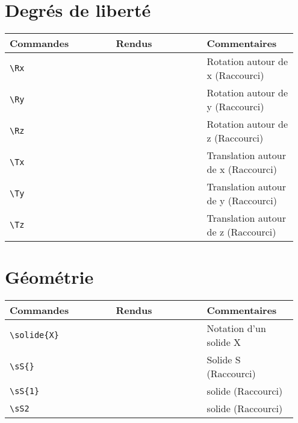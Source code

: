 \documentclass[a4paper,10pt]{article}
\newcommand{\rac}{({\color{red}Raccourci})}
\begin{document}
	\section{Degrés de liberté}
	\noindent
	\begin{tabular}{|p{0.35\linewidth}|p{0.3\linewidth}|p{0.3\linewidth}|}
		\hline
			\textbf{Commandes}&\textbf{Rendus}&\textbf{Commentaires}
		\\\hline\hline
			\verb!\Rx!			&	\Rx			&	Rotation autour de x \rac
		\\\hline
			\verb!\Ry!			&	\Ry			&	Rotation autour de y \rac
		\\\hline
			\verb!\Rz!			&	\Rz			&	Rotation autour de z \rac
		\\\hline
			\verb!\Tx!			&	\Tx			&	Translation autour de x \rac
		\\\hline
			\verb!\Ty!			&	\Ty			&	Translation autour de y \rac
		\\\hline
			\verb!\Tz!			&	\Tz			&	Translation autour de z \rac
		\\\hline
	\end{tabular}
	\section{Géométrie}
	\noindent
	\begin{tabular}{|p{0.35\linewidth}|p{0.3\linewidth}|p{0.3\linewidth}|}
		\hline
			\textbf{Commandes}&\textbf{Rendus}&\textbf{Commentaires}
		\\\hline\hline
			\verb!\solide{X}!		&	\solide{X}		&	Notation d'un solide X
		\\\hline
			\verb!\sS{}!			&	\sS{}			&	Solide S \rac
		\\\hline
			\verb!\sS{1}!			&	\sS{1}			&	solide \rac
		\\\hline
			\verb!\sS2!			&	\sS2			&	solide \rac
		\\\hline
	\end{tabular}
\end{document}
